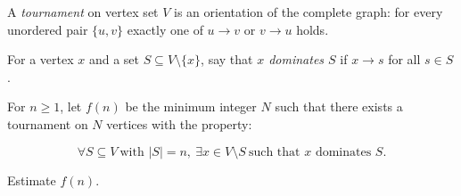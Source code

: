 A \emph{tournament} on vertex set $V$ is an orientation of the complete graph:
for every unordered pair $\{u,v\}$ exactly one of $u\to v$ or $v\to u$ holds.

For a vertex $x$ and a set $S\subseteq V\setminus\{x\}$, say that \emph{$x$
dominates $S$} if $x\to s$ for all $s\in S$.

For $n\ge 1$, let $f(n)$ be the minimum integer $N$ such that there exists a
tournament on $N$ vertices with the property:

\[ \forall S\subseteq V\ \text{with }|S|=n,\ \exists x\in V\setminus S\ \text{such that }x\text{ dominates }S. \]

Estimate $f(n)$.

